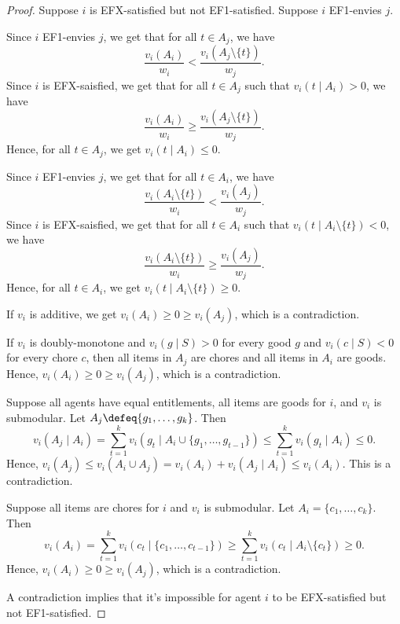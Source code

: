 \begin{proof}
Suppose $i$ is EFX-satisfied but not EF1-satisfied.
Suppose $i$ EF1-envies $j$.

Since $i$ EF1-envies $j$, we get that for all $t \in A_j$, we have
\[ \frac{v_i(A_i)}{w_i} < \frac{v_i(A_j \setminus \{t\})}{w_j}. \]
Since $i$ is EFX-saisfied, we get that
for all $t \in A_j$ such that $v_i(t \mid A_i) > 0$, we have
\[ \frac{v_i(A_i)}{w_i} \ge \frac{v_i(A_j \setminus \{t\})}{w_j}. \]
Hence, for all $t \in A_j$, we get $v_i(t \mid A_i) \le 0$.

Since $i$ EF1-envies $j$, we get that for all $t \in A_i$, we have
\[ \frac{v_i(A_i \setminus \{t\})}{w_i} < \frac{v_i(A_j)}{w_j}. \]
Since $i$ is EFX-saisfied, we get that
for all $t \in A_i$ such that $v_i(t \mid A_i \setminus \{t\}) < 0$, we have
\[ \frac{v_i(A_i \setminus \{t\})}{w_i} \ge \frac{v_i(A_j)}{w_j}. \]
Hence, for all $t \in A_i$, we get $v_i(t \mid A_i \setminus \{t\}) \ge 0$.

If $v_i$ is additive, we get $v_i(A_i) \ge 0 \ge v_i(A_j)$, which is a contradiction.

If $v_i$ is doubly-monotone and $v_i(g \mid S) > 0$ for every good $g$
and $v_i(c \mid S) < 0$ for every chore $c$, then
all items in $A_j$ are chores and all items in $A_i$ are goods.
Hence, $v_i(A_i) \ge 0 \ge v_i(A_j)$, which is a contradiction.

Suppose all agents have equal entitlements, all items are goods for $i$, and $v_i$ is submodular.
Let $A_j \defeq \{g_1, \ldots, g_k\}$. Then
\[ v_i(A_j \mid A_i) = \sum_{t=1}^k v_i(g_t \mid A_i \cup \{g_1, \ldots, g_{t-1}\})
\le \sum_{t=1}^k v_i(g_t \mid A_i) \le 0. \]
Hence, $v_i(A_j) \le v_i(A_i \cup A_j) = v_i(A_i) + v_i(A_j \mid A_i) \le v_i(A_i)$.
This is a contradiction.

Suppose all items are chores for $i$ and $v_i$ is submodular.
Let $A_i = \{c_1, \ldots, c_k\}$. Then
\[ v_i(A_i) = \sum_{t=1}^k v_i(c_t \mid \{c_1, \ldots, c_{t-1}\})
\ge \sum_{t=1}^k v_i(c_t \mid A_i \setminus \{c_t\}) \ge 0. \]
Hence, $v_i(A_i) \ge 0 \ge v_i(A_j)$, which is a contradiction.

A contradiction implies that it's impossible for agent $i$ to be
EFX-satisfied but not EF1-satisfied.
\end{proof}

